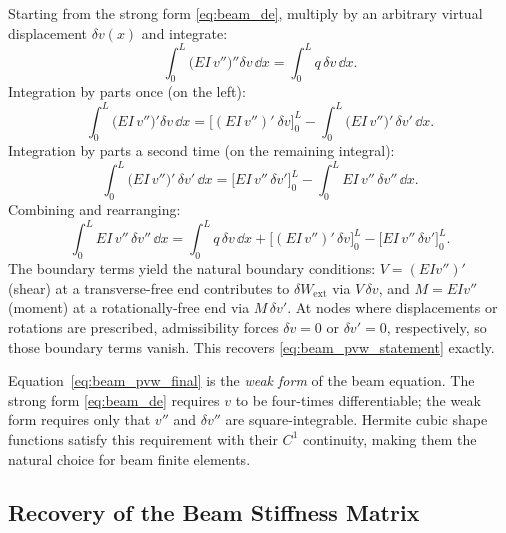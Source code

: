 Starting from the strong form \cref{eq:beam_de}, multiply by an arbitrary
virtual displacement $\delta v(x)$ and integrate:
\[
    \int_0^L \bigl(EI\,v''\bigr)''\delta v\,\dd x = \int_0^L q\,\delta v\,\dd x .
\]
Integration by parts once (on the left):
\begin{equation}
    \int_0^L \bigl(EI\,v''\bigr)'\delta v\,\dd x
    = \bigl[(EI\,v'')'\ \delta v\bigr]_0^L
      - \int_0^L \bigl(EI\,v''\bigr)'\,\delta v'\,\dd x .
    \label{eq:beam_pvw_ibp1}
\end{equation}
Integration by parts a second time (on the remaining integral):
\begin{equation}
    \int_0^L \bigl(EI\,v''\bigr)'\,\delta v'\,\dd x
    = \bigl[EI\,v''\,\delta v'\bigr]_0^L
      - \int_0^L EI\,v''\,\delta v''\,\dd x .
    \label{eq:beam_pvw_ibp2}
\end{equation}
Combining and rearranging:
\begin{equation}
    \int_0^L EI\,v''\,\delta v''\,\dd x
    = \int_0^L q\,\delta v\,\dd x
    + \bigl[(EI\,v'')'\,\delta v\bigr]_0^L
    - \bigl[EI\,v''\,\delta v'\bigr]_0^L .
    \label{eq:beam_pvw_final}
\end{equation}
The boundary terms yield the natural boundary conditions: $V = (EIv'')'$
(shear) at a transverse-free end contributes to $\delta W_{\mathrm{ext}}$ via
$V\,\delta v$, and $M = EI v''$ (moment) at a rotationally-free end via
$M\,\delta v'$. At nodes where displacements or rotations are prescribed,
admissibility forces $\delta v = 0$ or $\delta v' = 0$, respectively,
so those boundary terms vanish. This recovers \cref{eq:beam_pvw_statement}
exactly.

\begin{remark}
Equation~\cref{eq:beam_pvw_final} is the \emph{weak form} of the beam
equation. The strong form \cref{eq:beam_de} requires $v$ to be
four-times differentiable; the weak form requires only that $v''$ and
$\delta v''$ are square-integrable. Hermite cubic shape functions satisfy
this requirement with their $C^1$ continuity, making them the natural
choice for beam finite elements.
\end{remark}

\subsection{Recovery of the Beam Stiffness Matrix}

